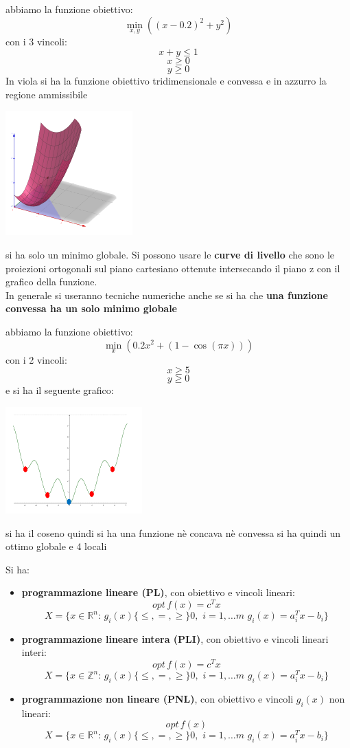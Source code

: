 \message{ !name(ro.tex)}\documentclass[a4paper,12pt, oneside]{book}
\begin{document}
\newpage
\begin{esempio}
  abbiamo la funzione obiettivo:
  \[\min_{x,y}((x-0.2)^2+y^2)\]
  con i 3 vincoli:
  \[x+y \leq 1\]
  \[x\geq 0\]
  \[y\geq 0\]
  In viola si ha la funzione obiettivo tridimensionale e convessa
  e in azzurro la regione ammissibile
  \begin{center}
    \includegraphics[scale = 1.3]{img/optes.png}
  \end{center}
  si ha solo un minimo globale.
  Si possono usare le \textbf{curve di livello} che sono le proiezioni
  ortogonali sul piano cartesiano ottenute intersecando il piano z con
  il grafico della funzione.\\
  In generale si useranno tecniche numeriche anche se si ha che
  \textbf{una funzione convessa ha un solo minimo globale}
\end{esempio}
\newpage
\begin{esempio}
  abbiamo la funzione obiettivo:
  \[\min_{x}(0.2x^2+(1-\cos(\pi x)))\]
  con i 2 vincoli:
  \[x\geq 5\]
  \[y\geq 0\]
  e si ha il seguente grafico:
  \begin{center}
    \includegraphics[scale = 1.3]{img/optes2.png}
  \end{center}
  si ha il coseno quindi si ha una funzione nè concava nè convessa
  si ha quindi un ottimo globale e 4 locali
\end{esempio}
Si ha:
\begin{itemize}
  \item \textbf{programmazione lineare (PL)}, con obiettivo e vincoli
  lineari:
  \[opt\,f(x)=c^T x\]
  \[X=\{x\in\mathbb{R}^n:\, g_i(x)\{\leq, =, \geq\}0,\,\,
    i=1,\ldots m\,\, g_i(x)=a_i^T x-b_i\}\]
  \item \textbf{programmazione lineare intera (PLI)}, con obiettivo e
  vincoli lineari interi:
  \[opt\,f(x)=c^T x\]
  \[X=\{x\in\mathbb{Z}^n:\, g_i(x)\{\leq, =, \geq\}0,\,\,
    i=1,\ldots m\,\, g_i(x)=a_i^T x-b_i\}\]
  \item \textbf{programmazione non lineare (PNL)}, con obiettivo e
  vincoli $g_i(x)$ non lineari:
  \[opt\,f(x)\]
  \[X=\{x\in\mathbb{R}^n:\, g_i(x)\{\leq, =, \geq\}0,\,\,
    i=1,\ldots m\,\, g_i(x)=a_i^T x-b_i\}\]
\end{itemize}
\end{document}
